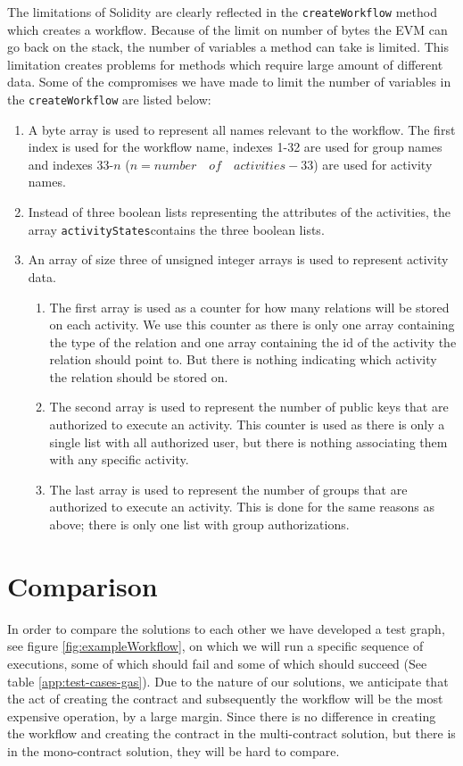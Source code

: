 \documentclass{article}
\begin{document}
	The limitations of Solidity are clearly reflected in the \texttt{createWorkflow} method which creates a workflow. 
	Because of the limit on number of bytes the EVM can go back on the stack, the number of variables a method can take is limited. 
	This limitation creates problems for methods which require large amount of different data. 
	Some of the compromises we have made to limit the number of variables in the \texttt{createWorkflow} are listed below:
	\begin{enumerate}
		\item A byte array is used to represent all names relevant to the workflow. The first index is used for the workflow name, indexes 1-32 are used for group names and indexes 33-$n$ ($n = number \quad of \quad activities - 33$) are used for activity names.
		\item Instead of three boolean lists representing the attributes of the activities, the array \texttt{activityStates}contains the three boolean lists.
		\item An array of size three of unsigned integer arrays is used to represent activity data. 
		\begin{enumerate}
			\item The first array is used as a counter for how many relations will be stored on each activity. We use this counter as there is only one array containing the type of the relation and one array containing the id of the activity the relation should point to. But there is nothing indicating which activity the relation should be stored on.
			\item The second array is used to represent the number of public keys that are authorized to execute an activity. This counter is used as there is only a single list with all authorized user, but there is nothing associating them with any specific activity.
			\item The last array is used to represent the number of groups that are authorized to execute an activity. This is done for the same reasons as above; there is only one list with group authorizations.
		\end{enumerate}
	\end{enumerate}

	\section{Comparison}
	\label{sec:comparison}

	In order to compare the solutions to each other we have developed a test graph, see figure \ref{fig:exampleWorkflow}, on which we will run a specific sequence of executions, some of which should fail and some of which should succeed (See table \ref{app:test-cases-gas}).
	Due to the nature of our solutions, we anticipate that the act of creating the contract and subsequently the workflow will be the most expensive operation, by a large margin.
	Since there is no difference in creating the workflow and creating the contract in the multi-contract solution, but there is in the mono-contract solution, they will be hard to compare.
\end{document}
